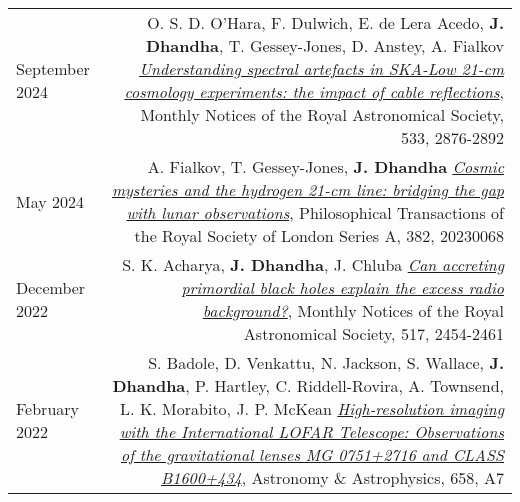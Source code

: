 \documentclass{article}
\begin{document}
\begin{longtable}{L!{\vrule}R}
    September 2024 &
    O. S. D. O'Hara, F. Dulwich, E. de Lera Acedo, \textbf{J. Dhandha}, T. Gessey-Jones, D. Anstey, A. Fialkov
    \href{https://ui.adsabs.harvard.edu/abs/2024MNRAS.533.2876O}{\textit{Understanding spectral artefacts in SKA-Low 21-cm cosmology experiments: the impact of cable reflections}},
    Monthly Notices of the Royal Astronomical Society, 533, 2876-2892 \\

    May 2024 &
    A. Fialkov, T. Gessey-Jones, \textbf{J. Dhandha}
    \href{https://ui.adsabs.harvard.edu/abs/2024RSPTA.38230068F}{\textit{Cosmic mysteries and the hydrogen 21-cm line: bridging the gap with lunar observations}},
    Philosophical Transactions of the Royal Society of London Series A, 382, 20230068 \\

    December 2022 &
    S. K. Acharya, \textbf{J. Dhandha}, J. Chluba
    \href{https://ui.adsabs.harvard.edu/abs/2022MNRAS.517.2454A}{\textit{Can accreting primordial black holes explain the excess radio background?}},
    Monthly Notices of the Royal Astronomical Society, 517, 2454-2461 \\

    February 2022 &
    S. Badole, D. Venkattu, N. Jackson, S. Wallace, \textbf{J. Dhandha}, P. Hartley, C. Riddell-Rovira, A. Townsend, L. K. Morabito, J. P. McKean
    \href{https://ui.adsabs.harvard.edu/abs/2022A&A...658A...7B}{\textit{High-resolution imaging with the International LOFAR Telescope: Observations of the gravitational lenses MG 0751+2716 and CLASS B1600+434}},
    Astronomy \& Astrophysics, 658, A7 \\
\end{longtable}
\end{document}
